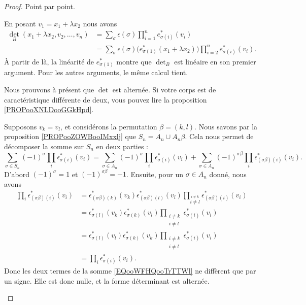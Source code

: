 \begin{proof}
	Point par point.
	\begin{subproof}
		\spitem[\ref{ITEMooAHOHooDZgtSB}]
		En posant \( v_1=x_1+\lambda x_2\) nous avons
		\begin{subequations}
			\begin{align}
				\det_B(x_1+\lambda x_2,v_2,\ldots, v_n) & =\sum_{\sigma}\epsilon(\sigma)\prod_{i=1}^ne^*_{\sigma(i)}(v_i)                                              \\
				                                        & =\sum_{\sigma}\epsilon(\sigma)\Big( e^*_{\sigma(1)}(x_1+\lambda x_2) \Big)\prod_{i=2}^ne^*_{\sigma(i)}(v_i).
			\end{align}
		\end{subequations}
		À partir de là, la linéarité de \( e^*_{\sigma(1)}\) montre que \( \det_B\) est linéaire en son premier argument. Pour les autres arguments, le même calcul tient.

		\spitem[\ref{ITEMooTXXBooBmDtzd}]

		Nous prouvons à présent que \( \det\) est alternée. Si votre corps est de caractéristique différente de deux, vous pouvez lire la proposition \ref{PROPooXNLDooGGkHpd}.

		Supposons \( v_k=v_l\), et considérons la permutation \( \beta=(k,l)\). Nous savons par la proposition \ref{PROPooZOWBooIMxxlj} que \( S_n=A_n\cup A_n\beta\). Cela nous permet de décomposer la somme sur \( S_n\) en deux parties :
		\begin{equation}        \label{EQooWFHQooTrTTWl}
			\sum_{\sigma\in S_n}(-1)^{\sigma}\prod_i\epsilon_{\sigma(i)}^*(v_i)=\sum_{\sigma\in A_n}(-1)^{\sigma}\prod_i\epsilon_{\sigma(i)}^*(v_i)+\sum_{\sigma\in A_n}(-1)^{\sigma\beta}\prod_i\epsilon_{(\sigma\beta)(i)}^*(v_i).
		\end{equation}
		D'abord \( (-1)^{\sigma}=1\) et \( (-1)^{\sigma\beta}=-1\). Ensuite, pour un \( \sigma\in A_n\) donné, nous avons
		\begin{subequations}
			\begin{align}
				\prod_i\epsilon^*_{(\sigma\beta)(i)}(v_i) & =\epsilon_{(\sigma\beta)(k)}^*(v_k)\epsilon^*_{(\sigma\beta)(l)}(v_l)\prod_{\stackrel{i\neq k}{i\neq l}}\epsilon_{(\sigma\beta)(i)}^*(v_i) \\
				                                          & =\epsilon^*_{\sigma(l)}(v_k)\epsilon^*_{\sigma(k)}(v_l)\prod_{\substack{i\neq k                                                            \\i\neq l}}\epsilon^*_{\sigma(i)}(v_i)\\
				                                          & =\epsilon^*_{\sigma(l)}(v_l)\epsilon^*_{\sigma(k)}(v_k)\prod_{\substack{i\neq k                                                            \\i\neq l}}\epsilon^*_{\sigma(i)}(v_i)\\
				                                          & =\prod_i\epsilon^*_{\sigma(i)}(v_i).
			\end{align}
		\end{subequations}
		Donc les deux termes de la somme \eqref{EQooWFHQooTrTTWl} ne diffèrent que par un signe. Elle est donc nulle, et la forme déterminant est alternée.


\end{subproof}
\end{proof}

